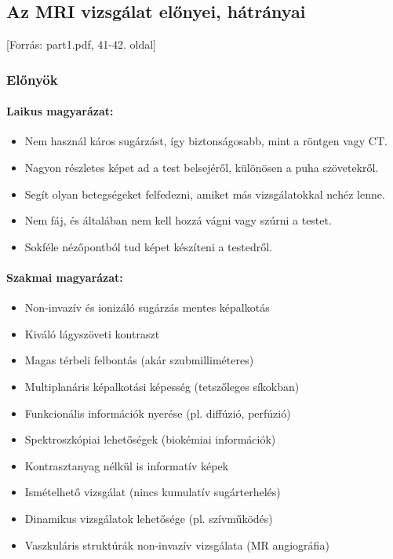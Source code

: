 \documentclass[a4paper,12pt]{article}
\begin{document}
\subsection{Az MRI vizsgálat előnyei, hátrányai} [Forrás: part1.pdf, 41-42. oldal]

\subsubsection{Előnyök}

\paragraph{Laikus magyarázat:} \begin{itemize} \item Nem használ káros sugárzást, így biztonságosabb, mint a röntgen vagy CT. \item Nagyon részletes képet ad a test belsejéről, különösen a puha szövetekről. \item Segít olyan betegségeket felfedezni, amiket más vizsgálatokkal nehéz lenne. \item Nem fáj, és általában nem kell hozzá vágni vagy szúrni a testet. \item Sokféle nézőpontból tud képet készíteni a testedről. \end{itemize}

\paragraph{Szakmai magyarázat:} \begin{itemize} \item Non-invazív és ionizáló sugárzás mentes képalkotás \item Kiváló lágyszöveti kontraszt \item Magas térbeli felbontás (akár szubmilliméteres) \item Multiplanáris képalkotási képesség (tetszőleges síkokban) \item Funkcionális információk nyerése (pl. diffúzió, perfúzió) \item Spektroszkópiai lehetőségek (biokémiai információk) \item Kontrasztanyag nélkül is informatív képek \item Ismételhető vizsgálat (nincs kumulatív sugárterhelés) \item Dinamikus vizsgálatok lehetősége (pl. szívműködés) \item Vaszkuláris struktúrák non-invazív vizsgálata (MR angiográfia) \end{itemize}
\end{document}

